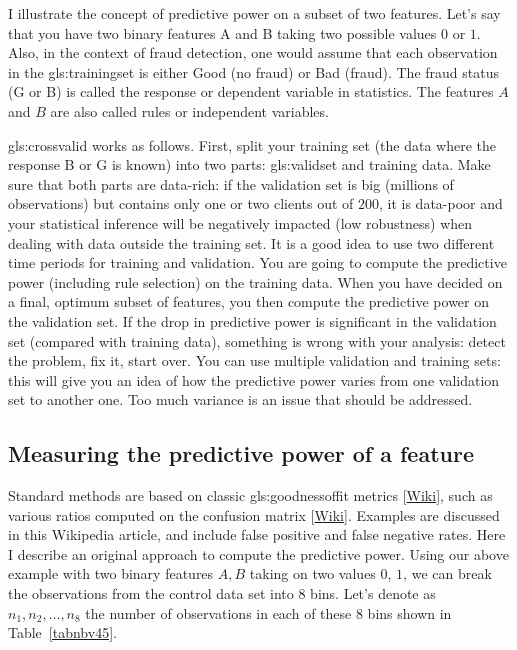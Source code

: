 \documentclass[oneside,10pt]{book}
\begin{document}
I illustrate the concept of predictive power on a subset of two features. Let’s say that you have two binary features A and B taking two possible values $0$ or $1$. Also, in the context of fraud detection, one would assume that each observation in the \gls{gls:trainingset} is either Good (no fraud) or Bad (fraud). The fraud status (G or B) is called the response or dependent variable in statistics. The features $A$ and $B$ are also called rules or independent variables.

\Gls{gls:crossvalid} works as follows. First, split your \textcolor{index}{training set} (the data where the response B or G is known) into two parts: 
\gls{gls:validset} and training data. Make sure that both parts are data-rich: if the validation set is big (millions of observations) but contains only one or two clients out of $200$, it is data-poor and your statistical inference will be negatively impacted (low robustness) when dealing with data outside the training set. It is a good idea to use two different time periods for training and validation. You are going to compute the predictive power (including rule selection) on the training data. When you have decided on a final, optimum subset of features, you then compute the predictive power on the validation set. If the drop in predictive power is significant in the validation set (compared with training data), something is wrong with your analysis: detect the problem, fix it, start over. You can use multiple validation and training sets: this will give you an idea of how the predictive power varies from one validation set to another one. Too much variance is an issue that should be addressed.

\subsection{Measuring the predictive power of a feature}\label{secdr}

Standard methods are based on classic  \gls{gls:goodnessoffit} metrics [\href{https://en.wikipedia.org/wiki/Goodness_of_fit}{Wiki}], such as various ratios computed on the \textcolor{index}{confusion matrix} 
[\href{https://en.wikipedia.org/wiki/Confusion_matrix}{Wiki}]. Examples are discussed in this Wikipedia article, and include false positive and false negative rates.
Here I describe an original approach to compute the \textcolor{index}{predictive power}. Using our above example with two binary features $A, B$ taking on two values $0$, $1$, we can break the observations from the control data set into $8$ bins.  Let's denote as $n_1, n_2,\dots,n_8$ the number of observations in each of these $8$ bins
shown in Table~\ref{tabnbv45}. 
\end{document}
